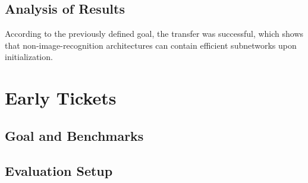\subsection*{Analysis of Results}
According to the previously defined goal, the transfer was successful, which shows that non-image-recognition architectures can contain efficient subnetworks upon initialization.


\section{Early Tickets}
\subsection*{Goal and Benchmarks}
\subsection*{Evaluation Setup}

